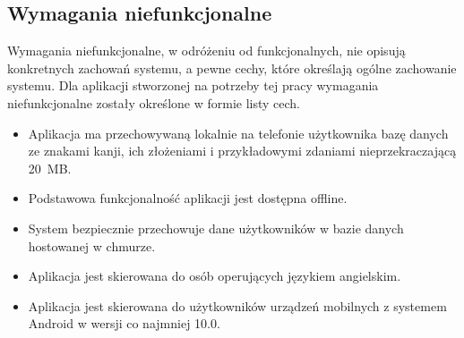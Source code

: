 \documentclass[a4paper,twoside,12pt]{book}
\begin{document}
\subsection{Wymagania niefunkcjonalne}
Wymagania niefunkcjonalne, w odróżeniu od funkcjonalnych, nie opisują konkretnych zachowań systemu, a pewne cechy, które określają ogólne zachowanie systemu. Dla aplikacji stworzonej na potrzeby tej pracy wymagania niefunkcjonalne zostały określone w formie listy cech. 
\begin{itemize}
\item Aplikacja ma przechowywaną lokalnie na telefonie użytkownika bazę danych ze znakami kanji, ich złożeniami i przykładowymi zdaniami nieprzekraczającą 20~MB. 
\item Podstawowa funkcjonalność aplikacji jest dostępna offline.
\item System bezpiecznie przechowuje dane użytkowników w bazie danych hostowanej w chmurze.
\item Aplikacja jest skierowana do osób operujących językiem angielskim.
\item Aplikacja jest skierowana do użytkowników urządzeń mobilnych z systemem Android w wersji co najmniej 10.0.
\end{itemize}
\end{document}
